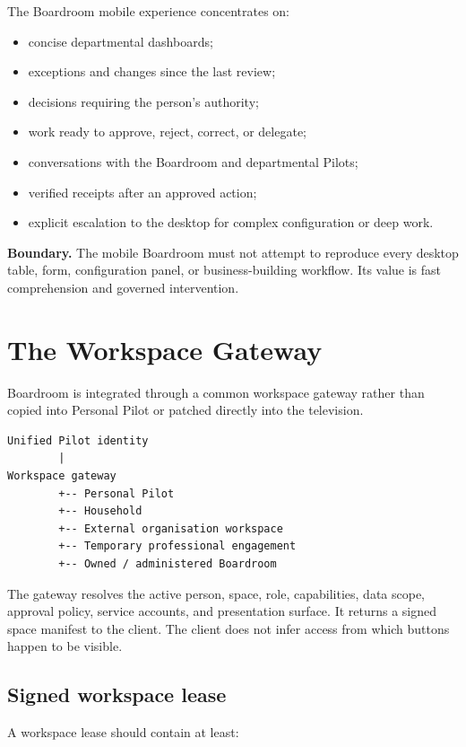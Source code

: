 \documentclass[11pt,a4paper]{article}
\newcommand{\boundary}[1]{%
  \par\medskip\noindent
  \colorbox{pilotamber!10}{\parbox{0.94\linewidth}{\textbf{Boundary.} #1}}%
  \par\medskip}
\begin{document}
The Boardroom mobile experience concentrates on:

\begin{itemize}[leftmargin=*]
  \item concise departmental dashboards;
  \item exceptions and changes since the last review;
  \item decisions requiring the person's authority;
  \item work ready to approve, reject, correct, or delegate;
  \item conversations with the Boardroom and departmental Pilots;
  \item verified receipts after an approved action;
  \item explicit escalation to the desktop for complex configuration or deep work.
\end{itemize}

\boundary{The mobile Boardroom must not attempt to reproduce every desktop
table, form, configuration panel, or business-building workflow.  Its value is
fast comprehension and governed intervention.}

\section{The Workspace Gateway}

Boardroom is integrated through a common workspace gateway rather than copied
into Personal Pilot or patched directly into the television.

\begin{lstlisting}[style=pilotcode]
Unified Pilot identity
        |
Workspace gateway
        +-- Personal Pilot
        +-- Household
        +-- External organisation workspace
        +-- Temporary professional engagement
        +-- Owned / administered Boardroom
\end{lstlisting}

The gateway resolves the active person, space, role, capabilities, data scope,
approval policy, service accounts, and presentation surface.  It returns a
signed space manifest to the client.  The client does not infer access from
which buttons happen to be visible.

\subsection{Signed workspace lease}

A workspace lease should contain at least:
\end{document}
